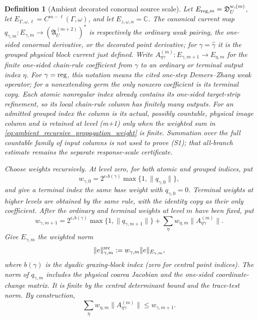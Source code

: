 \documentclass[11pt]{amsart}
\theoremstyle{compactplain}
\theoremstyle{compactdefinition}
\newtheorem{definition}[theorem]{Definition}
\theoremstyle{compactremark}
\begin{document}
\begin{definition}[Ambient decorated conormal source scale]
Let \(E_{{\rm reg},m}=\mathfrak D_U^{w,(m)}\), let
\(E_{\Gamma,\omega,\ell}=C^{m-\ell}(\Gamma,\omega)\), and let
\(E_{z,\omega,\alpha}=\mathbb C\).  The canonical current map
\(q_{\gamma,m}:E_{\gamma,m}\to(\mathfrak A_U^{(m+2)})^*\) is respectively the
ordinary weak pairing, the one-sided conormal derivative, or the decorated
point derivative; for \(\gamma=\widehat\gamma\) it is the grouped physical
block current just defined.  Write
\(A_{\eta\gamma}^{(m)}:E_{\gamma,m+1}\to E_{\eta,m}\) for the finite
one-sided chain-rule coefficient from \(\gamma\) to an ordinary or terminal
output index \(\eta\).  For \(\gamma={\rm reg}\), this notation means the
cited one-step Demers--Zhang weak operator; for a nonextending germ the only
nonzero coefficient is its terminal copy.  Each atomic nonregular index
already contains its one-sided target-strip refinement, so its local
chain-rule column has finitely many outputs.  For an admitted grouped index
the column is its actual, possibly countable, physical image column and is
retained at level (m+1) only when the weighted sum in
\eqref{eq:ambient_recursive_propagation_weight} is finite.  Summation over the
full countable family of input columns is not used to prove (S1); that
all-branch estimate remains the separate response-scale certificate.

Choose weights recursively.  At level zero, for both atomic and grouped
indices, put
\[
 w_{\gamma,0}
 =2^{\epsilon_*b(\gamma)}\max\{1,\|q_{\gamma,0}\|\},
\]
and give a terminal index the same base weight with \(q_{\gamma,0}=0\).
Terminal weights at higher levels are obtained by the same rule, with the
identity copy as their only coefficient.  After the ordinary and terminal
weights at level \(m\) have been fixed, put
\begin{equation}
\label{eq:ambient_recursive_propagation_weight}
 w_{\gamma,m+1}
 =2^{\epsilon_*b(\gamma)}\max\{1,\|q_{\gamma,m+1}\|\}
  +\sum_{\eta}w_{\eta,m}\|A_{\eta\gamma}^{(m)}\|.
\end{equation}
Give \(E_{\gamma,m}\) the weighted norm
\begin{equation}
\label{eq:ambient_local_coefficient_weight}
 \|e\|_{\gamma,m}^{\rm src}
 :=w_{\gamma,m}\|e\|_{E_{\gamma,m}},
\end{equation}
where \(b(\gamma)\) is the dyadic grazing-block index (zero for central point
indices).  The norm of \(q_{\gamma,m}\) includes the physical coarea Jacobian
and the one-sided coordinate-change matrix.  It is finite by the central
determinant bound and the trace-test norm.  By construction,
\begin{equation}
\label{eq:ambient_propagation_column_bound}
 \sum_\eta w_{\eta,m}\|A_{\eta\gamma}^{(m)}\|
 \le w_{\gamma,m+1}.
\end{equation}


\end{definition}
\end{document}
